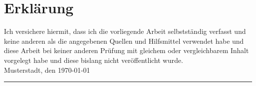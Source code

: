 %
%
%

\chapter*{Erklärung} %

Ich versichere hiermit, dass ich die vorliegende Arbeit selbstständig verfasst und keine anderen als die angegebenen Quellen und Hilfsmittel verwendet habe und diese Arbeit bei keiner anderen Prüfung mit gleichem oder vergleichbarem Inhalt vorgelegt habe und diese bislang nicht veröffentlicht wurde. %
\\[2ex]

Musterstadt, den \today

\rule[-0.2cm]{5cm}{0.5pt}

\vspace*{-2ex}
\autor \\[10ex]

\rmfamily

\thispagestyle{empty}

